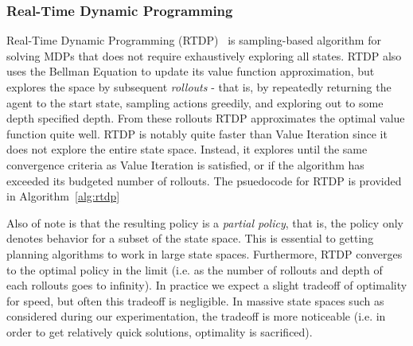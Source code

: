 \documentclass[11pt]{article}
\begin{document}
\subsubsection{Real-Time Dynamic Programming}

Real-Time Dynamic Programming (RTDP)~\cite{barto1995learning} is sampling-based algorithm for solving MDPs that does not require exhaustively exploring all states. RTDP also uses the Bellman Equation to update its value function approximation, but explores the space by subsequent {\it rollouts} - that is, by repeatedly returning the agent to the start state, sampling actions greedily, and exploring out to some depth specified depth. From these rollouts RTDP approximates the optimal value function quite well. RTDP is notably quite faster than Value Iteration since it does not explore the entire state space. Instead, it explores until the same convergence criteria as Value Iteration is satisfied, or if the algorithm has exceeded its budgeted number of rollouts. The psuedocode for RTDP is provided in Algorithm~\ref{alg:rtdp}

Also of note is that the resulting policy is a {\it partial policy}, that is, the policy only denotes behavior for a subset of the state space. This is essential to getting planning algorithms to work in large state spaces. Furthermore, RTDP converges to the optimal policy in the limit (i.e. as the number of rollouts and depth of each rollouts goes to infinity). In practice we expect a slight tradeoff of optimality for speed, but often this tradeoff is negligible. In massive state spaces such as considered during our experimentation, the tradeoff is more noticeable (i.e. in order to get relatively quick solutions, optimality is sacrificed).
\end{document}

